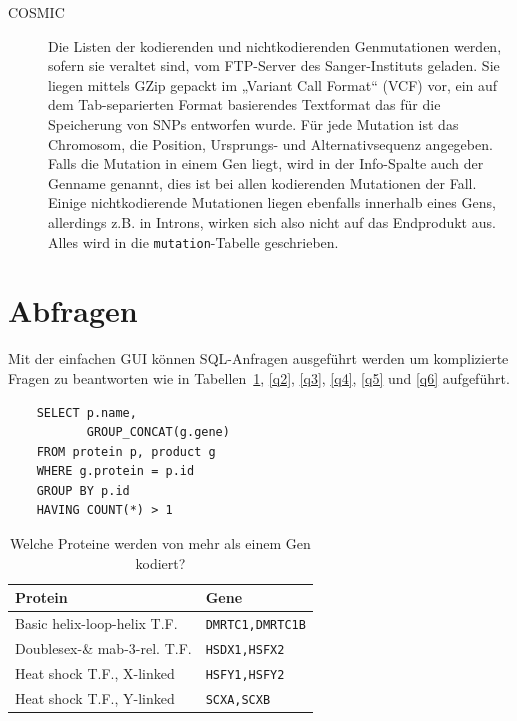 \documentclass{scrartcl}
\begin{document}
\begin{description}
\item[COSMIC]
Die Listen der kodierenden und nichtkodierenden Genmutationen werden, sofern sie veraltet sind, vom FTP-Server des Sanger-Instituts geladen. Sie liegen mittels GZip gepackt im „Variant Call Format“ (VCF) vor, ein auf dem Tab-separierten Format basierendes Textformat das für die Speicherung von SNPs entworfen wurde. Für jede Mutation ist das Chromosom, die Position, Ursprungs- und Alternativsequenz angegeben. Falls die Mutation in einem Gen liegt, wird in der Info-Spalte auch der Genname genannt, dies ist bei allen kodierenden Mutationen der Fall. Einige nichtkodierende Mutationen liegen ebenfalls innerhalb eines Gens, allerdings z.B. in Introns, wirken sich also nicht auf das Endprodukt aus. Alles wird in die \texttt{mutation}-Tabelle geschrieben.
\end{description}

\section{Abfragen}

Mit der einfachen GUI können SQL-Anfragen ausgeführt werden um komplizierte Fragen zu beantworten wie in Tabellen~\ref{q1}, \ref{q2}, \ref{q3}, \ref{q4}, \ref{q5} und \ref{q6} aufgeführt.

\begin{table}[H]
	\noindent\begin{minipage}{.4\hsize}
	\begin{verbatim}
	SELECT p.name,
	       GROUP_CONCAT(g.gene)
	FROM protein p, product g
	WHERE g.protein = p.id
	GROUP BY p.id
	HAVING COUNT(*) > 1
	\end{verbatim}
	\end{minipage}
	\begin{minipage}{.6\hsize}
	\hfill\begin{tabular}{ll}
	\toprule
	Protein & Gene\\
	\midrule
	Basic helix-loop-helix T.F.&\texttt{DMRTC1,DMRTC1B}\\
	Doublesex-\& mab-3-rel. T.F.&\texttt{HSDX1,HSFX2}\\
	Heat shock T.F., X-linked&\texttt{HSFY1,HSFY2}\\
	Heat shock T.F., Y-linked&\texttt{SCXA,SCXB}\\
	\bottomrule
	\end{tabular}
	\end{minipage}
	\caption{Welche Proteine werden von mehr als einem Gen kodiert?}\label{q1}
\end{table}
\end{document}

